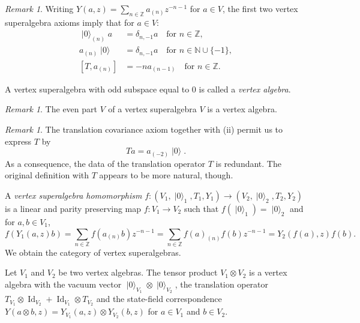\documentclass[a4paper, 12pt, reqno]{amsart}
\theoremstyle{remark}
\newtheorem{remark}[theorem]{Remark}
\DeclareMathOperator{\Id}{Id}
\DeclareMathOperator{\vac}{|0\rangle}
\DeclareMathOperator{\zero}{\overline{0}}
\begin{document}
\begin{remark}
  \label{rmk:9}
  Writing $Y(a, z) = \sum_{n \in \mathbb{Z}}a_{(n)}z^{-n - 1}$ for $a \in V$, the first two vertex superalgebra axioms imply that for $a \in V$:
  \begin{align*}
    \vac_{(n)}a &= \delta_{n, -1}a \quad \text{for $n \in \mathbb{Z}$}, \\
    a_{(n)}\vac &= \delta_{n, -1}a \quad \text{for $n \in \mathbb{N} \cup \{-1\}$}, \\
    [T, a_{(n)}] &= -na_{(n - 1)} \quad \text{for $n \in \mathbb{Z}$}.
  \end{align*}
\end{remark}

A vertex superalgebra with odd subspace equal to $0$ is called a \emph{vertex algebra}.

\begin{remark}
  \label{rmk:10}
  The even part $V_{\zero}$ of a vertex superalgebra $V$ is a vertex algebra.
\end{remark}

\begin{remark}
  \label{rmk:11}
  The translation covariance axiom together with (ii) permit us to express $T$ by
  \begin{equation}
    \label{eq:12}
    Ta = a_{(-2)}\vac.
  \end{equation}
  As a consequence, the data of the translation operator $T$ is redundant.
  The original definition with $T$ appears to be more natural, though.
\end{remark}

A \emph{vertex superalgebra homomorphism} $f: (V_1, \vac_1, T_1, Y_1) \to (V_2, \vac_2, T_2, Y_2)$ is a linear and parity preserving map $f: V_1 \to V_2$ such that $f(\vac_1) = \vac_2$ and for $a, b \in V_1$,
\begin{equation*}
  f(Y_1(a, z)b) = \sum_{n \in \mathbb{Z}}f(a_{(n)}b)z^{-n - 1} = \sum_{n \in \mathbb{Z}}f(a)_{(n)}f(b)z^{-n - 1} = Y_2(f(a), z)f(b).
\end{equation*}
We obtain the category of vertex superalgebras.

Let $V_1$ and $V_2$ be two vertex algebras.
The tensor product $V_1 \otimes V_2$ is a vertex algebra with the vacuum vector $\vac_{V_1}\otimes\vac_{V_2}$, the translation operator $T_{V_1}\otimes\Id_{V_2} + \Id_{V_1}\otimes T_{V_2}$ and the state-field correspondence $Y(a\otimes b, z) = Y_{V_1}(a, z)\otimes Y_{V_2}(b, z)$ for $a \in V_1$ and $b \in V_2$.
\end{document}
